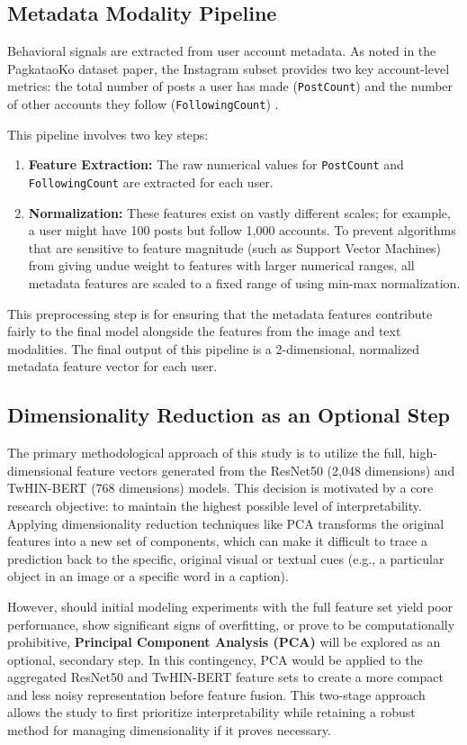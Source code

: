 \subsection{Metadata Modality Pipeline}
Behavioral signals are extracted from user account metadata. As noted in the PagkataoKo dataset paper, the Instagram subset provides two key account-level metrics: the total number of posts a user has made (\texttt{PostCount}) and the number of other accounts they follow (\texttt{FollowingCount}) \citep{tighe_acorda_2022}.

This pipeline involves two key steps:
\begin{enumerate}
	\item \textbf{Feature Extraction:} The raw numerical values for \texttt{PostCount} and \texttt{FollowingCount} are extracted for each user.
	\item \textbf{Normalization:} These features exist on vastly different scales; for example, a user might have 100 posts but follow 1,000 accounts. To prevent algorithms that are sensitive to feature magnitude (such as Support Vector Machines) from giving undue weight to features with larger numerical ranges, all metadata features are scaled to a fixed range of  using min-max normalization.
\end{enumerate}
This preprocessing step is for ensuring that the metadata features contribute fairly to the final model alongside the features from the image and text modalities. The final output of this pipeline is a 2-dimensional, normalized metadata feature vector for each user.

\subsection{Dimensionality Reduction as an Optional Step}
The primary methodological approach of this study is to utilize the full, high-dimensional feature vectors generated from the ResNet50 (2,048 dimensions) and TwHIN-BERT (768 dimensions) models. This decision is motivated by a core research objective: to maintain the highest possible level of interpretability. Applying dimensionality reduction techniques like PCA transforms the original features into a new set of components, which can make it difficult to trace a prediction back to the specific, original visual or textual cues (e.g., a particular object in an image or a specific word in a caption).

However, should initial modeling experiments with the full feature set yield poor performance, show significant signs of overfitting, or prove to be computationally prohibitive, \textbf{Principal Component Analysis (PCA)} will be explored as an optional, secondary step. In this contingency, PCA would be applied to the aggregated ResNet50 and TwHIN-BERT feature sets to create a more compact and less noisy representation before feature fusion. This two-stage approach allows the study to first prioritize interpretability while retaining a robust method for managing dimensionality if it proves necessary.

